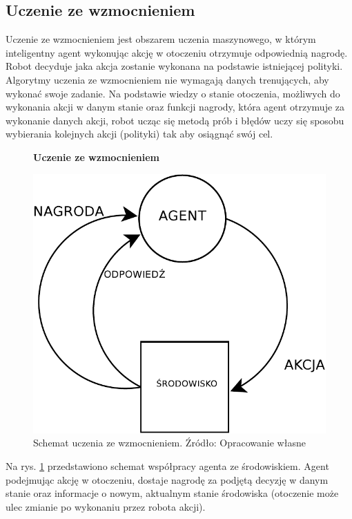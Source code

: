 \subsection{Uczenie ze wzmocnieniem}
\label{subsec:uczeniezewzmocnieniem}

Uczenie ze wzmocnieniem jest obszarem uczenia maszynowego, w którym inteligentny agent wykonując akcję w otoczeniu otrzymuje odpowiednią nagrodę.
Robot decyduje jaka akcja zostanie wykonana na podstawie istniejącej polityki. Algorytmy uczenia ze wzmocnieniem nie 
wymagają danych trenujących, aby wykonać swoje zadanie. Na podstawie wiedzy o stanie otoczenia, możliwych do wykonania 
akcji w danym stanie oraz funkcji nagrody, która agent otrzymuje za wykonanie danych akcji, robot ucząc się metodą prób 
i błędów uczy się sposobu wybierania kolejnych akcji (polityki) tak aby osiągnąć swój cel.

\begin{figure}[h]
    \centering
    \textbf{Uczenie ze wzmocnieniem}\par\medskip
    \includegraphics[scale=0.8]{DIAGRAMreinforcementlearning}
    \caption{Schemat uczenia ze wzmocnieniem. Źródło: Opracowanie własne}
    \label{fig:DIAGRAMreinforcementlearning}
\end{figure}

Na rys. \ref{fig:DIAGRAMreinforcementlearning} przedstawiono schemat współpracy agenta ze środowiskiem. Agent 
podejmując akcję w otoczeniu, dostaje nagrodę za podjętą decyzję w danym stanie oraz informacje o nowym, aktualnym 
stanie środowiska (otoczenie może ulec zmianie po wykonaniu przez robota akcji).


